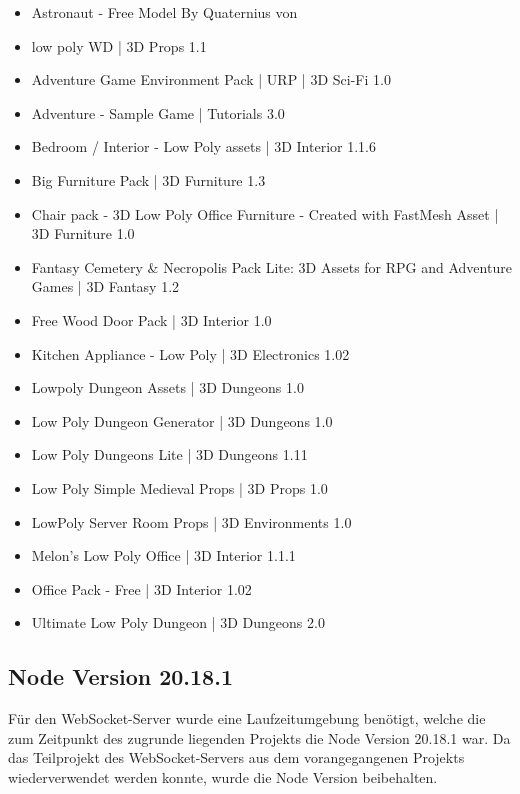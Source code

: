 \begin{itemize}  
    \item Astronaut - Free Model By Quaternius von \cite{quaternius_astronaut_2022}
    \item low poly WD | 3D Props 1.1 \cite{squid_low_2023}
    \item Adventure Game Environment Pack | URP | 3D Sci-Fi 1.0 \cite{unity_technologies_adventure_2023}
    \item Adventure - Sample Game | Tutorials 3.0 \cite{unity_technologies_adventure_2024}
    \item Bedroom / Interior - Low Poly assets | 3D Interior 1.1.6 \cite{fries_and_seagull_bedroom_2025}
    \item Big Furniture Pack | 3D Furniture 1.3 \cite{vertex_studio_big_2027}
    \item Chair pack - 3D Low Poly Office Furniture - Created with FastMesh Asset | 3D Furniture 1.0 \cite{fast_mesh_chair_2024}
    \item Fantasy Cemetery \& Necropolis Pack Lite: 3D Assets for RPG and Adventure Games | 3D Fantasy 1.2 \cite{emaceart_fantasy_2022}
    \item Free Wood Door Pack | 3D Interior 1.0 \cite{biostart_free_2024}
    \item Kitchen Appliance - Low Poly | 3D Electronics 1.02 \cite{alstra_infinite_kitchen_2021}
    \item Lowpoly Dungeon Assets | 3D Dungeons 1.0 \cite{kunniki_lowpoly_2018}
    \item Low Poly Dungeon Generator | 3D Dungeons 1.0 \cite{mysticforge_low_2025}
    \item Low Poly Dungeons Lite | 3D Dungeons 1.11 \cite{justcreate_low_2024}
    \item Low Poly Simple Medieval Props | 3D Props 1.0 \cite{justcreate_low_2023}
    \item LowPoly Server Room Props | 3D Environments 1.0 \cite{ipoly3d_lowpoly_2021}
    \item Melon's Low Poly Office | 3D Interior 1.1.1 \cite{mistyczny_arbuz_melons_2022}
    \item Office Pack - Free | 3D Interior 1.02 \cite{nappin_office_2024}
    \item Ultimate Low Poly Dungeon | 3D Dungeons 2.0 \cite{broken_vector_ultimate_2022}
\end{itemize}

\subsection{Node Version 20.18.1}
Für den WebSocket-Server wurde eine Laufzeitumgebung benötigt, welche die zum Zeitpunkt des zugrunde liegenden Projekts die Node Version 20.18.1 war. Da das Teilprojekt des WebSocket-Servers aus dem vorangegangenen Projekts wiederverwendet werden konnte, wurde die Node Version beibehalten.

